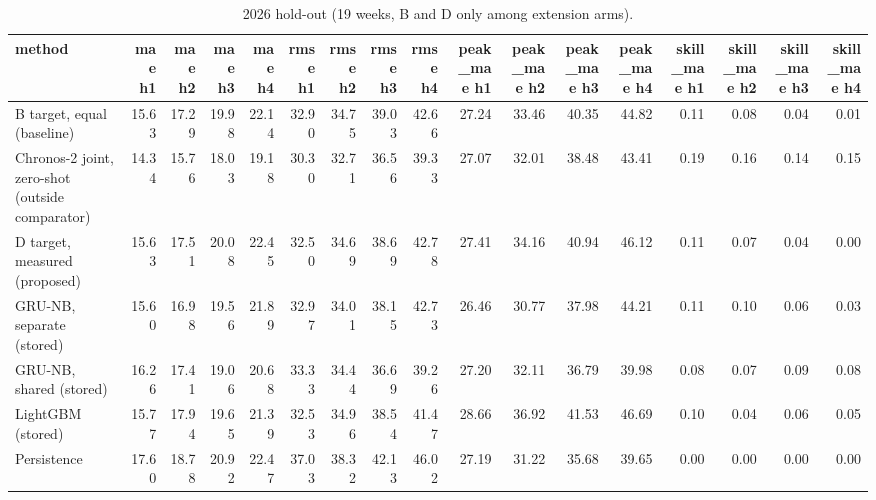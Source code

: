 \begin{table}[t]
\centering
\small
\caption{2026 hold-out (19 weeks, B and D only among extension arms).}
\label{tab:holdout-2026-metrics}
\begin{tabular}{lrrrrrrrrrrrrrrrr}
\toprule
method & mae h1 & mae h2 & mae h3 & mae h4 & rmse h1 & rmse h2 & rmse h3 & rmse h4 & peak\_mae h1 & peak\_mae h2 & peak\_mae h3 & peak\_mae h4 & skill\_mae h1 & skill\_mae h2 & skill\_mae h3 & skill\_mae h4 \\
\midrule
B target, equal (baseline) & 15.63 & 17.29 & 19.98 & 22.14 & 32.90 & 34.75 & 39.03 & 42.66 & 27.24 & 33.46 & 40.35 & 44.82 & 0.11 & 0.08 & 0.04 & 0.01 \\
Chronos-2 joint, zero-shot (outside comparator) & 14.34 & 15.76 & 18.03 & 19.18 & 30.30 & 32.71 & 36.56 & 39.33 & 27.07 & 32.01 & 38.48 & 43.41 & 0.19 & 0.16 & 0.14 & 0.15 \\
D target, measured (proposed) & 15.63 & 17.51 & 20.08 & 22.45 & 32.50 & 34.69 & 38.69 & 42.78 & 27.41 & 34.16 & 40.94 & 46.12 & 0.11 & 0.07 & 0.04 & 0.00 \\
GRU-NB, separate (stored) & 15.60 & 16.98 & 19.56 & 21.89 & 32.97 & 34.01 & 38.15 & 42.73 & 26.46 & 30.77 & 37.98 & 44.21 & 0.11 & 0.10 & 0.06 & 0.03 \\
GRU-NB, shared (stored) & 16.26 & 17.41 & 19.06 & 20.68 & 33.33 & 34.44 & 36.69 & 39.26 & 27.20 & 32.11 & 36.79 & 39.98 & 0.08 & 0.07 & 0.09 & 0.08 \\
LightGBM (stored) & 15.77 & 17.94 & 19.65 & 21.39 & 32.53 & 34.96 & 38.54 & 41.47 & 28.66 & 36.92 & 41.53 & 46.69 & 0.10 & 0.04 & 0.06 & 0.05 \\
Persistence & 17.60 & 18.78 & 20.92 & 22.47 & 37.03 & 38.32 & 42.13 & 46.02 & 27.19 & 31.22 & 35.68 & 39.65 & 0.00 & 0.00 & 0.00 & 0.00 \\
\bottomrule
\end{tabular}
\end{table}
